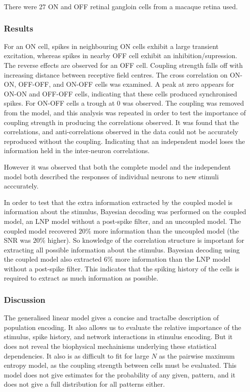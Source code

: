 \documentclass[a4paper,12pt]{article}
\theoremstyle{definition}
\begin{document}
	There were 27 ON and OFF retinal gangloin cells from a macaque retina used. 
	
\subsubsection*{Results}
	For an ON cell, spikes in neighbouring ON cells exhibit a large transient excitation, whereas spikes in nearby OFF cell exhibit an inhibition/supression. The reverse effects are observed for an OFF cell. Coupling strength falls off with increasing distance between receptive field centres. The cross correlation on ON-ON, OFF-OFF, and ON-OFF cells was examined. A peak at zero appears for ON-ON and OFF-OFF cells, indicating that these cells produced synchronised spikes. For ON-OFF cells a trough at 0 was observed. The coupling was removed from the model, and this analysis was repeated in order to test the importance of coupling strength in producing the correlations observed. It was found that the correlations, and anti-correlations observed in the data could not be accurately reproduced without the coupling. Indicating that an independent model loses the information held in the inter-neuron correlations. 
	
	However it was observed that both the complete model and the independent model both described the responses of individual neurons to new stimuli acccurately. 
	
	In order to test that the extra information extracted by the coupled model is information about the stimulus, Bayesian decoding was performed on the coupled model, an LNP model without a post-spike filter, and an uncoupled model. The coupled model recovered $20\%$ more information than the uncoupled model (the SNR was $20\%$ higher). So knowledge of the correlation structure is important for extracting all possible information about the stimulus. Bayesian decoding using the coupled model also extracted $6\%$ more information than the LNP model without a post-spike filter. This indicates that the spiking history of the cells is required to extract as much information as possible.

\subsubsection*{Discussion}
	The generalised linear model gives a concise and tractalbe description of population encoding. It also allows us to evaluate the relative importance of the stimulus, spike history, and network interactions in stimulus encoding. But it does not reveal the biophysical mechainisms underlying these statistical dependencies. It also is as difficult to fit for large $N$ as the pairwise maximum entropy model, as the coupling strength between cells must be evaluated. This model does not give estimates for the probability of any given, pattern, and it does not give a full distribution for all patterns either.
\end{document}
